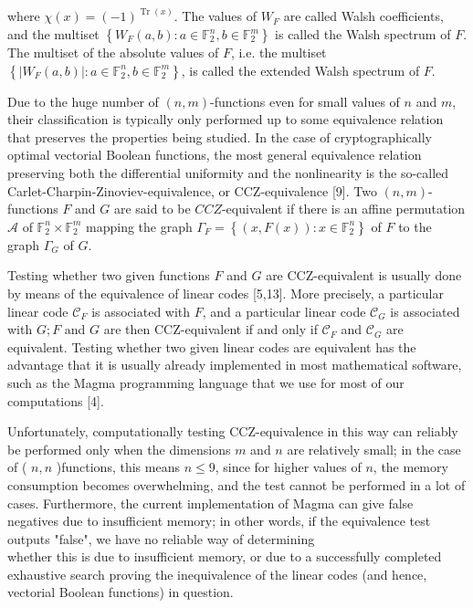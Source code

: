 \documentclass[10pt]{article}
\begin{document}
where $\chi(x)=(-1)^{\operatorname{Tr}(x)}$. The values of $W_{F}$ are called Walsh coefficients, and the multiset $\left\{W_{F}(a, b): a \in \mathbb{F}_{2}^{n}, b \in \mathbb{F}_{2}^{m}\right\}$ is called the Walsh spectrum of $F$. The multiset of the absolute values of $F$, i.e. the multiset $\left\{\left|W_{F}(a, b)\right|: a \in \mathbb{F}_{2}^{n}, b \in \mathbb{F}_{2}^{m}\right\}$, is called the extended Walsh spectrum of $F$.

Due to the huge number of $(n, m)$-functions even for small values of $n$ and $m$, their classification is typically only performed up to some equivalence relation that preserves the properties being studied. In the case of cryptographically optimal vectorial Boolean functions, the most general equivalence relation preserving both the differential uniformity and the nonlinearity is the so-called Carlet-Charpin-Zinoviev-equivalence, or CCZ-equivalence [9]. Two $(n, m)$-functions $F$ and $G$ are said to be $C C Z$-equivalent if there is an affine permutation $\mathcal{A}$ of $\mathbb{F}_{2}^{n} \times \mathbb{F}_{2}^{m}$ mapping the graph $\Gamma_{F}=\left\{(x, F(x)): x \in \mathbb{F}_{2}^{n}\right\}$ of $F$ to the graph $\Gamma_{G}$ of $G$.

Testing whether two given functions $F$ and $G$ are CCZ-equivalent is usually done by means of the equivalence of linear codes [5,13]. More precisely, a particular linear code $\mathcal{C}_{F}$ is associated with $F$, and a particular linear code $\mathcal{C}_{G}$ is associated with $G ; F$ and $G$ are then CCZ-equivalent if and only if $\mathcal{C}_{F}$ and $\mathcal{C}_{G}$ are equivalent. Testing whether two given linear codes are equivalent has the advantage that it is usually already implemented in most mathematical software, such as the Magma programming language that we use for most of our computations [4].

Unfortunately, computationally testing CCZ-equivalence in this way can reliably be performed only when the dimensions $m$ and $n$ are relatively small; in the case of ( $n, n$ )functions, this means $n \leq 9$, since for higher values of $n$, the memory consumption becomes overwhelming, and the test cannot be performed in a lot of cases. Furthermore, the current implementation of Magma can give false negatives due to insufficient memory; in other words, if the equivalence test outputs "false", we have no reliable way of determining\\
whether this is due to insufficient memory, or due to a successfully completed exhaustive search proving the inequivalence of the linear codes (and hence, vectorial Boolean functions) in question.
\end{document}
